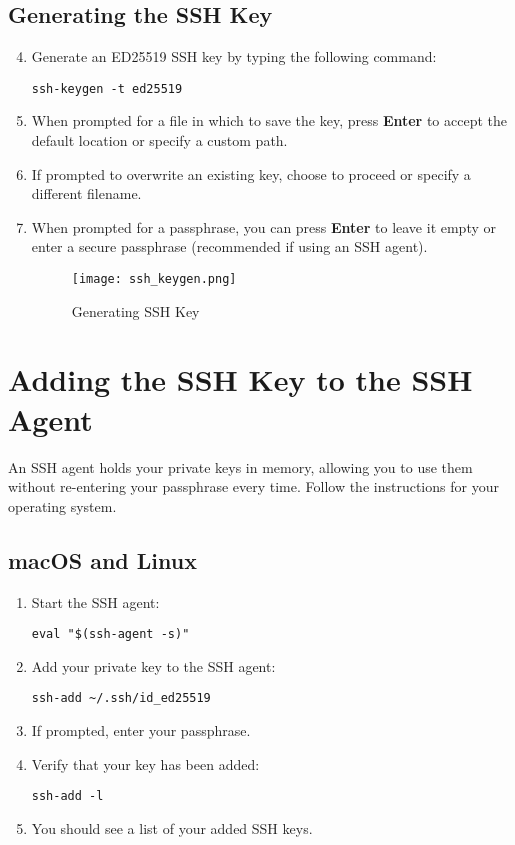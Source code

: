 \documentclass[12pt,letterpaper]{article}
\begin{document}
\subsection{Generating the SSH Key}
\begin{enumerate}
    \setcounter{enumi}{3}
    \item Generate an ED25519 SSH key by typing the following command:
    \begin{lstlisting}[style=custombash]
ssh-keygen -t ed25519
    \end{lstlisting}
    \item When prompted for a file in which to save the key, press \textbf{Enter} to accept the default location or specify a custom path.
    \item If prompted to overwrite an existing key, choose to proceed or specify a different filename.
    \item When prompted for a passphrase, you can press \textbf{Enter} to leave it empty or enter a secure passphrase (recommended if using an SSH agent).

    \begin{figure}[H]
        \centering
        \texttt{[image: ssh\_keygen.png]}
        \caption{Generating SSH Key}
        \label{fig:ssh_keygen}
    \end{figure}
\end{enumerate}

\section{Adding the SSH Key to the SSH Agent}

An SSH agent holds your private keys in memory, allowing you to use them without re-entering your passphrase every time. Follow the instructions for your operating system.

\subsection{macOS and Linux}

\begin{enumerate}
    \item Start the SSH agent:
    \begin{lstlisting}[style=custombash]
eval "$(ssh-agent -s)"
    \end{lstlisting}
    \item Add your private key to the SSH agent:
    \begin{lstlisting}[style=custombash]
ssh-add ~/.ssh/id_ed25519
    \end{lstlisting}
    \item If prompted, enter your passphrase.
    \item Verify that your key has been added:
    \begin{lstlisting}[style=custombash]
ssh-add -l
    \end{lstlisting}
    \item You should see a list of your added SSH keys.
\end{enumerate}
\end{document}
